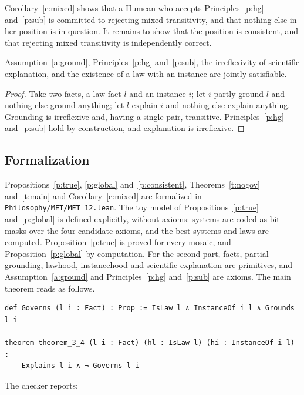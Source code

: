 \documentclass{situationist-preprint}
\begin{document}
Corollary~\ref{c:mixed} shows that a Humean who accepts Principles~\ref{p:hg} and~\ref{p:sub} is committed to rejecting mixed transitivity, and that nothing else in her position is in question. It remains to show that the position is consistent, and that rejecting mixed transitivity is independently correct.

\begin{proposition}[Consistency]\label{p:consistent}
Assumption~\ref{a:ground}, Principles~\ref{p:hg} and~\ref{p:sub}, the irreflexivity of scientific explanation, and the existence of a law with an instance are jointly satisfiable.
\end{proposition}

\begin{proof}
Take two facts, a law-fact $l$ and an instance $i$; let $i$ partly ground $l$ and nothing else ground anything; let $l$ explain $i$ and nothing else explain anything. Grounding is irreflexive and, having a single pair, transitive. Principles~\ref{p:hg} and~\ref{p:sub} hold by construction, and explanation is irreflexive.
\end{proof}

\subsection{Formalization}\label{s:formal}

Propositions~\ref{p:true}, \ref{p:global} and~\ref{p:consistent}, Theorems~\ref{t:nogov} and~\ref{t:main} and Corollary~\ref{c:mixed} are formalized in \nolinkurl{Philosophy/MET/MET_12.lean}. The toy model of Propositions~\ref{p:true} and~\ref{p:global} is defined explicitly, without axioms: systems are coded as bit masks over the four candidate axioms, and the best systems and laws are computed. Proposition~\ref{p:true} is proved for every mosaic, and Proposition~\ref{p:global} by computation. For the second part, facts, partial grounding, lawhood, instancehood and scientific explanation are primitives, and Assumption~\ref{a:ground} and Principles~\ref{p:hg} and~\ref{p:sub} are axioms. The main theorem reads as follows.

\begin{lstlisting}
def Governs (l i : Fact) : Prop := IsLaw l ∧ InstanceOf i l ∧ Grounds l i

theorem theorem_3_4 (l i : Fact) (hl : IsLaw l) (hi : InstanceOf i l) :
    Explains l i ∧ ¬ Governs l i
\end{lstlisting}

The checker reports:
\end{document}
